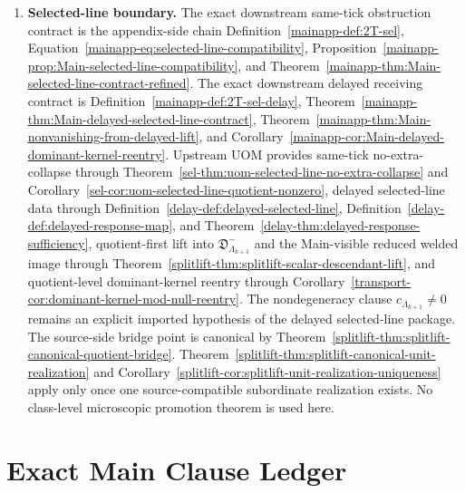 \documentclass[11pt]{article}
\theoremstyle{definition}
\theoremstyle{plain}
\theoremstyle{remark}
\begin{document}
\begin{enumerate}[leftmargin=2em]
\item \textbf{Selected-line boundary.}
  The exact downstream same-tick obstruction contract is the appendix-side chain
  Definition~\ref*{mainapp-def:2T-sel},
  Equation~\ref*{mainapp-eq:selected-line-compatibility},
  Proposition~\ref*{mainapp-prop:Main-selected-line-compatibility}, and
  Theorem~\ref*{mainapp-thm:Main-selected-line-contract-refined}.
  The exact downstream delayed receiving contract is
  Definition~\ref*{mainapp-def:2T-sel-delay},
  Theorem~\ref*{mainapp-thm:Main-delayed-selected-line-contract},
  Theorem~\ref*{mainapp-thm:Main-nonvanishing-from-delayed-lift}, and
  Corollary~\ref*{mainapp-cor:Main-delayed-dominant-kernel-reentry}.
  Upstream UOM provides same-tick no-extra-collapse through
  Theorem~\ref*{sel-thm:uom-selected-line-no-extra-collapse} and
  Corollary~\ref*{sel-cor:uom-selected-line-quotient-nonzero},
  delayed selected-line data through
  Definition~\ref*{delay-def:delayed-selected-line},
  Definition~\ref*{delay-def:delayed-response-map}, and
  Theorem~\ref*{delay-thm:delayed-response-sufficiency},
  quotient-first lift into \(\mathfrak D^-_{\Lambda_{k+1}}\) and the Main-visible reduced welded
  image through
  Theorem~\ref*{splitlift-thm:splitlift-scalar-descendant-lift},
  and quotient-level dominant-kernel reentry through
  Corollary~\ref*{transport-cor:dominant-kernel-mod-null-reentry}.
  The nondegeneracy clause \(c_{\Lambda_{k+1}}\neq 0\) remains an explicit imported hypothesis of
  the delayed selected-line package.
  The source-side bridge point is canonical by
  Theorem~\ref*{splitlift-thm:splitlift-canonical-quotient-bridge}.
  Theorem~\ref*{splitlift-thm:splitlift-canonical-unit-realization} and
  Corollary~\ref*{splitlift-cor:splitlift-unit-realization-uniqueness} apply only once one
  source-compatible subordinate realization exists.
  No class-level microscopic promotion theorem is used here.
\end{enumerate}

\section{Exact Main Clause Ledger}
\end{document}
